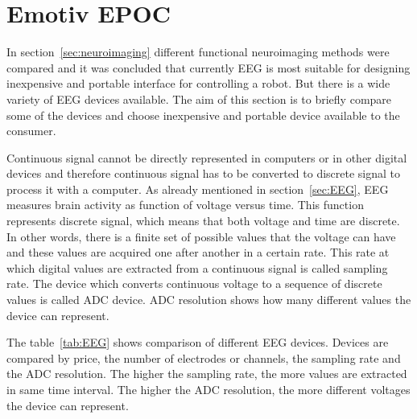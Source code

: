\section{Emotiv EPOC}
\label{sec:EEG_comparison}

In section~\ref{sec:neuroimaging} different functional neuroimaging methods were compared and it was concluded that currently \gls{EEG} is most suitable for designing inexpensive and portable interface for controlling a robot. But there is a wide variety of EEG devices available. The aim of this section is to briefly compare some of the devices and choose inexpensive and portable device available to the consumer.

Continuous signal cannot be directly represented in computers or in other digital devices and therefore continuous signal has to be converted to discrete signal to process it with a computer. As already mentioned in section~\ref{sec:EEG}, \gls{EEG} measures brain activity as function of voltage versus time. This function represents discrete signal, which means that both voltage and time are discrete. In other words, there is a finite set of possible values that the voltage can have and these values are acquired one after another in a certain rate. This rate at which digital values are extracted from a continuous signal is called \gls{sampling rate}. The device which converts continuous voltage to a sequence of discrete values is called \gls{ADC} device. \gls{ADC} resolution shows how many different values the device can represent.

The table~\ref{tab:EEG} shows comparison of different \gls{EEG} devices. Devices are compared by price, the number of electrodes or channels, the \gls{sampling rate} and the \gls{ADC} resolution. The higher the sampling rate, the more values are extracted in same time interval. The higher the \gls{ADC} resolution, the more different voltages the device can represent.

\newcommand{\patiCHamp}{\tablefootnote{http://www.brainvision.com/files/actiCHamp-PyCorder-Flyer\_US.pdf}}
\newcommand{\pmitsar}{\tablefootnote{http://www.novatecheeg.com/products--software.html}}
\newcommand{\pemotiv}{\tablefootnote{https://emotiv.com/epoc.php}}
\newcommand{\pmindwave}{\tablefootnote{http://store.neurosky.com/products/mindwave-1}}
\newcommand{\mitsarspec}{\tablefootnote{http://www.mitsar-medical.com/eeg-machine/eeg-amplifier-compare/}}
\newcommand{\popenbci}{\tablefootnote{http://openbci.myshopify.com/products/openbci-8-bit-board-kit}}

